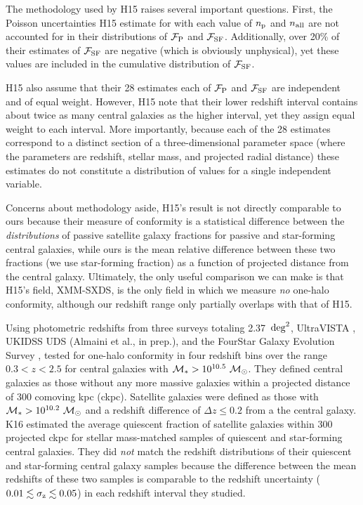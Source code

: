 The methodology used by H15 raises several important questions.
First, the Poisson uncertainties H15 estimate for with each value of $\np$ and $\nall$ are not accounted for in their distributions of $\fP$ and $\fSF$.
Additionally, over 20\% of their estimates of $\fSF$ are negative (which is obviously unphysical), yet these values are included in the cumulative distribution of $\fSF$.

H15 also assume that their 28 estimates each of $\fP$ and $\fSF$ are independent and of equal weight.
However, H15 note that their lower redshift interval contains about twice as many central galaxies as the higher interval, yet they assign equal weight to each interval.
More importantly, because each of the 28 estimates correspond to a distinct section of a three-dimensional parameter space (where the parameters are redshift, stellar mass, and projected radial distance) these estimates do not constitute a distribution of values for a single independent variable.

Concerns about methodology aside, H15's result is not directly comparable to ours because their measure of conformity is a statistical difference between the \emph{distributions} of passive satellite galaxy fractions for passive and star-forming central galaxies, while ours is the mean relative difference between these two fractions (we use star-forming fraction) as a function of projected distance from the central galaxy.
Ultimately, the only useful comparison we can make is that H15's field, XMM-SXDS, is the only field in which we measure \emph{no} one-halo conformity, although our redshift range only partially overlaps with that of H15.


Using photometric redshifts from three surveys totaling 2.37~$\degsq$,
UltraVISTA \citep{McCracken12},
UKIDSS \citep{Lawrence07} UDS (Almaini et al., in prep.),
and the FourStar Galaxy Evolution Survey \citep[ZFOURGE;][]{Spitler12},
\citet[][hereafter K16]{Kawinwanichakij16} tested for one-halo conformity in four redshift bins over the range ${0.3 < z < 2.5}$ for central galaxies with ${\mstar>10^{10.5}~\msun}$.
They defined central galaxies as those without any more massive galaxies within a projected distance of 300 comoving kpc (ckpc).
Satellite galaxies were defined as those with ${\mstar>10^{10.2}~\msun}$ and a redshift difference of ${\Delta z \le 0.2}$ from a the central galaxy.
K16 estimated the average quiescent fraction of satellite galaxies within 300 projected ckpc for stellar mass-matched samples of quiescent and star-forming central galaxies.
They did \emph{not} match the redshift distributions of their quiescent and star-forming central galaxy samples because the difference between the mean redshifts of these two samples is comparable to the redshift uncertainty (${0.01 \lesssim \sigmaz \lesssim 0.05}$) in each redshift interval they studied.

